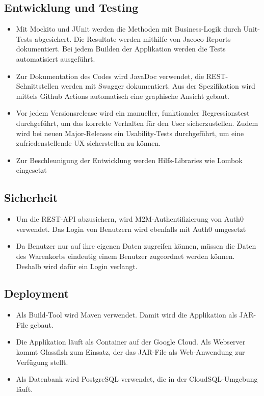 \documentclass[
]{article}
\begin{document}
\subsection{Entwicklung und Testing}
\begin{itemize}
\item Mit Mockito und JUnit werden die Methoden mit Business-Logik durch Unit-Tests abgesichert. Die Resultate werden mithilfe von Jacoco Reports dokumentiert. Bei jedem Builden der Applikation werden die Tests automatisiert ausgeführt.
\item Zur Dokumentation des Codes wird JavaDoc verwendet, die REST-Schnittstellen werden mit Swagger dokumentiert. Aus der Spezifikation wird mittels Github Actions automatisch eine graphische Ansicht gebaut.
\item Vor jedem Versionsrelease wird ein manueller, funktionaler Regressionstest durchgeführt, um das korrekte Verhalten für den User sicherzustellen. Zudem wird bei neuen Major-Releases ein Usability-Tests durchgeführt, um eine zufriedenstellende UX sicherstellen zu können.
\item Zur Beschleunigung der Entwicklung werden Hilfs-Libraries wie Lombok eingesetzt
\end{itemize}


\subsection{Sicherheit}
\begin{itemize}
\item Um die REST-API abzusichern, wird M2M-Authentifizierung von Auth0 verwendet. Das Login von Benutzern wird ebenfalls mit Auth0 umgesetzt
\item Da Benutzer nur auf ihre eigenen Daten zugreifen können, müssen die Daten des Warenkorbs eindeutig einem Benutzer zugeordnet werden können. Deshalb wird dafür ein Login verlangt.
\end{itemize}


\subsection{Deployment}
\begin{itemize}
\item Als Build-Tool wird Maven verwendet. Damit wird die Applikation als JAR-File gebaut.
\item Die Applikation läuft als Container auf der Google Cloud. Als Webserver kommt Glassfish zum Einsatz, der das JAR-File als Web-Anwendung zur Verfügung stellt.
\item Als Datenbank wird PostgreSQL verwendet, die in der CloudSQL-Umgebung läuft.
\end{itemize}
\end{document}
